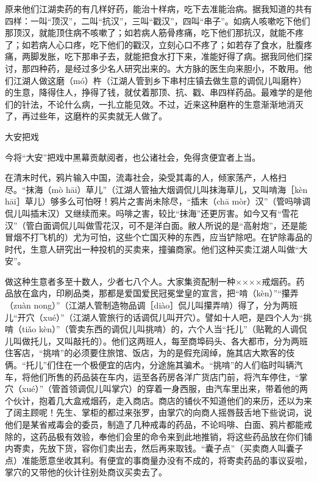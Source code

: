 \documentclass[12pt,UTF8]{ctexbook}
\begin{document}
原来他们江湖卖药的有几样好药，能治十样病，吃下去准能治病。据我知道的共有四样：一叫“顶汉”，二叫“抗汉”，三叫“戳汉”，四叫“串子”。如病人咳嗽吃下他们那顶汉，就能顶住病不咳嗽了；如若病人筋骨疼痛，吃下他们那抗汉，就能不疼了；如若病人心口疼，吃下他们的戳汉，立刻心口不疼了；如若存了食水，肚腹疼痛，两脚发胀，吃下那串子去，就能把食水打下来，准能好得了病。据我同他们探讨，那四种药，是经过多少名人研究出来的。大方脉的医生向来胆小，不敢用。他们江湖人做这磨（mó）杵（江湖人管到乡下串村庄镇去做生意的调侃儿叫磨杵）的生意，降得住人，挣得了钱，就仗着那顶、抗、戳、串四样药品。最难学的是他们的针法，不论什么病，一扎立能见效。不过，近来这种磨杵的生意渐渐地消灭了，再过些年，这磨杵的买卖就无人做了。





大安把戏


今将“大安”把戏中黑幕贡献阅者，也公诸社会，免得贪便宜者上当。

在清末时代，鸦片输入中国，流毒社会，染受其毒的人，倾家荡产，人格扫尽。“抹海（mò hāi）草儿”（江湖人管抽大烟调侃儿叫抹海草儿，又叫啃海［kèn hāi］草儿）够多么可怕呀！鸦片之害尚未除尽，“插末（chā mòr）汉”（管吗啡调侃儿叫插末汉）又继续而来。吗啡之害，较比“抹海”还更厉害。如今又有“雪花汉”（管白面调侃儿叫做雪花汉，可不是洋白面。敝人所说的是“高射炮”，还是能冒烟不打飞机的）尤为可怕，这些个亡国灭种的东西，应当铲除吧。在铲除毒品的时代，生意人研究出一种投机的买卖来，撞骗商家。他们这种买卖江湖人叫做“大安”。

做这种生意者多至十数人，少者七八个人。大家集资配制一种××××戒烟药。药品放在盒内，印刷品类，那都是爱国爱民冠冕堂皇的宣言，把“啃（kèn）”“攥弄（zuàn nong）”（江湖人管制造物品调［diào］侃儿叫攥弄啃）得了，分为两班儿“开穴（xué）”（江湖人管旅行的话调侃儿叫开穴）。譬如十人吧，是四个人为“挑啃（tiǎo kèn）”（管卖东西的调侃儿叫挑啃）的，六个人当“托儿”（贴靴的人调侃儿叫做托儿，又叫敲托的）。他们这两班人，每至商埠码头、各大都市，分为两班住客店，“挑啃”的必须要住旅馆、饭店，为的是假充阔绰，施其店大欺客的伎俩。“托儿”们住在一个极便宜的店内，分途施其骗术。“挑啃”的人们临时叫辆汽车，将他们所售的药品装在车内，运至各药房各洋广货店门前，将汽车停住，“掌穴（xué）”（管首领调侃儿叫掌穴）的穿着一身西服，由汽车里出来，带着他的两个伙计，抱着几大盒戒烟药，走入商店。商店的铺伙不知道他们的来历，还以为来了阔主顾呢！先生、掌柜的都过来张罗，由掌穴的向商人摇唇鼓舌地下些说词，说他们是某省戒毒会的委员，制造了几种戒毒的药品，不论吗啡、白面、鸦片都能戒除的，这药品极有效验，奉他们会里的命令来到此地推销，将这些药品放在你们铺内寄卖，先放下货，容你们卖出去，然后再来取钱。“囊子点”（买卖商人叫囊子点）准能愿意坐收其利。有便宜的事商量办没有不成的，将寄卖药品的事议妥啦，掌穴的又带他的伙计往别处商议买卖去了。
\end{document}
